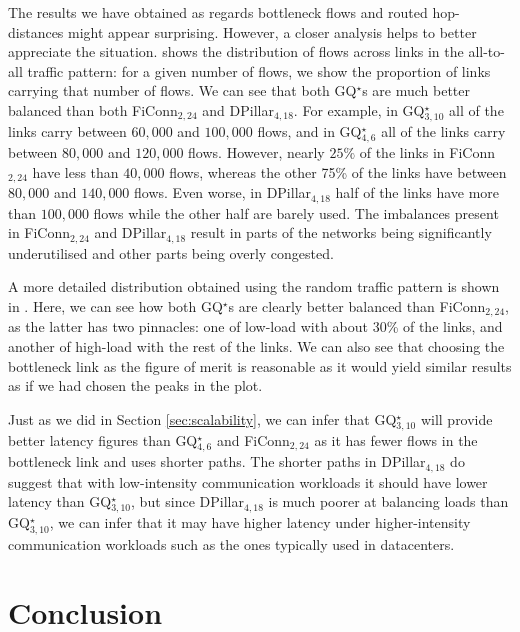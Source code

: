 \documentclass[]{amsart}
\begin{document}
{The results we have obtained as regards bottleneck flows and routed hop-distances might appear surprising. However, a closer analysis helps to better appreciate the situation.  shows the distribution of flows across links in the all-to-all traffic pattern: for a given number of flows, we show the proportion of links carrying that number of flows. We can see that both GQ$^\star$s are much better balanced than both FiConn$_{2,24}$ and DPillar$_{4,18}$. For example, in GQ$^\star_{3,10}$ all of the links carry between $60,000$ and $100,000$ flows, and in GQ$^\star_{4,6}$ all of the links carry between $80,000$ and $120,000$ flows. However, nearly $25\%$ of the links in
FiConn$_{2,24}$ have less than $40,000$ flows, whereas the
other 75\% of the links have between $80,000$ and $140,000$ flows. Even worse, in DPillar$_{4,18}$  half of the links
have more than $100,000$ flows while the other half are barely used. The imbalances present in FiConn$_{2,24}$ and DPillar$_{4,18}$ result in parts of the networks being significantly underutilised and other parts being overly congested.

A more detailed distribution obtained using the random traffic pattern
is shown in .  Here, we can see how both
GQ$^\star$s are clearly better balanced than FiConn$_{2,24}$, as the
latter has two pinnacles: one of low-load with about 30\% of the links,
and another of high-load with the rest of the links.  We can also see
that choosing the bottleneck link as the figure of merit is reasonable
as it would yield similar results as if we had chosen the peaks in the
plot.

Just as we did in Section \ref{sec:scalability}, we can infer that GQ$^\star_{3,10}$
will provide better latency figures than GQ$^\star_{4,6}$ and
FiConn$_{2,24}$ as it has fewer flows in the bottleneck link and
uses shorter paths.  The shorter paths in DPillar$_{4,18}$ do suggest that
with low-intensity communication workloads it should have lower
latency than GQ$^\star_{3,10}$, but since DPillar$_{4,18}$ is much poorer at
balancing loads than GQ$^\star_{3,10}$, we can infer that it may have
higher latency under higher-intensity communication workloads such
as the ones typically used in datacenters.

\section{Conclusion}
\label{sec:conclusion}


}
\end{document}

